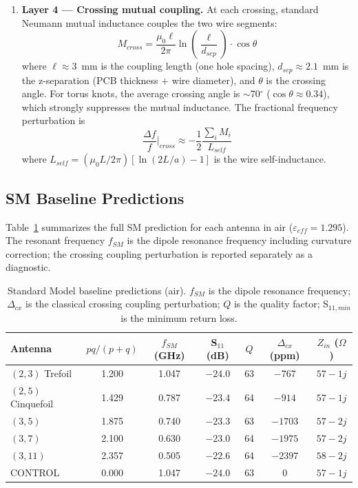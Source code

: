 \begin{enumerate}
    \item \textbf{Layer 4 --- Crossing mutual coupling.} At each crossing, standard Neumann mutual inductance couples the two wire segments:
    \begin{equation}
        M_{cross} = \frac{\mu_0 \ell}{2\pi}\ln\!\left(\frac{\ell}{d_{sep}}\right) \cdot \cos\theta
        \label{eq:m_cross}
    \end{equation}
    where $\ell \approx 3$~mm is the coupling length (one hole spacing), $d_{sep} \approx 2.1$~mm is the z-separation (PCB thickness + wire diameter), and $\theta$ is the crossing angle. For torus knots, the average crossing angle is $\sim$70$^\circ$ ($\cos\theta \approx 0.34$), which strongly suppresses the mutual inductance. The fractional frequency perturbation is
    \begin{equation}
        \frac{\Delta f}{f}\bigg|_{cross} \approx -\frac{1}{2}\frac{\sum_i M_i}{L_{self}}
    \end{equation}
    where $L_{self} = (\mu_0 L/2\pi)[\ln(2L/a) - 1]$ is the wire self-inductance.
\end{enumerate}

\subsection{SM Baseline Predictions}

Table~\ref{tab:sm_baseline} summarizes the full SM prediction for each antenna in air ($\varepsilon_{eff} = 1.295$). The resonant frequency $f_{SM}$ is the dipole resonance frequency including curvature correction; the crossing coupling perturbation is reported separately as a diagnostic.

\begin{table}[ht]
\centering
\caption{Standard Model baseline predictions (air). $f_{SM}$ is the dipole resonance frequency; $\Delta_{cx}$ is the classical crossing coupling perturbation; $Q$ is the quality factor; S$_{11,min}$ is the minimum return loss.}
\label{tab:sm_baseline}
\begin{tabular}{|l|c|c|c|c|c|c|}
\hline
Antenna & $pq/(p{+}q)$ & $f_{SM}$ (GHz) & S$_{11}$ (dB) & $Q$ & $\Delta_{cx}$ (ppm) & $Z_{in}$ ($\Omega$) \\ \hline
$(2,3)$ Trefoil    & 1.200 & 1.047 & $-24.0$ & 63 & $-767$  & $57 - 1j$ \\
$(2,5)$ Cinquefoil & 1.429 & 0.787 & $-23.4$ & 64 & $-914$  & $57 - 1j$ \\
$(3,5)$            & 1.875 & 0.740 & $-23.3$ & 63 & $-1703$ & $57 - 2j$ \\
$(3,7)$            & 2.100 & 0.630 & $-23.0$ & 64 & $-1975$ & $57 - 2j$ \\
$(3,11)$           & 2.357 & 0.505 & $-22.6$ & 64 & $-2397$ & $58 - 2j$ \\
CONTROL            & 0.000 & 1.047 & $-24.0$ & 63 & $0$     & $57 - 1j$ \\ \hline
\end{tabular}
\end{table}


